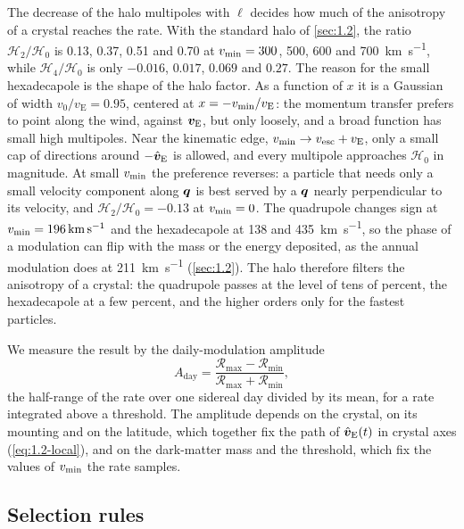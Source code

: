 The decrease of the halo multipoles with $\ell$ decides how much of the anisotropy of a crystal reaches the rate. With the standard halo of \cref{sec:1.2}, the ratio $\mathcal{H}_2/\mathcal{H}_0$ is 0.13, 0.37, 0.51 and 0.70 at $v_{\mathrm{min}} = 300$, 500, 600 and \SI{700}{km.s^{-1}}, while $\mathcal{H}_4/\mathcal{H}_0$ is only $-0.016$, $0.017$, $0.069$ and $0.27$. The reason for the small hexadecapole is the shape of the halo factor. As a function of $x$ it is a Gaussian of width $v_0/v_{\mathrm{E}} = 0.95$, centered at $x = -v_{\mathrm{min}}/v_{\mathrm{E}}$: the momentum transfer prefers to point along the wind, against $\bm{v}_{\mathrm{E}}$, but only loosely, and a broad function has small high multipoles. Near the kinematic edge, $v_{\mathrm{min}} \to v_{\mathrm{esc}} + v_{\mathrm{E}}$, only a small cap of directions around $-\hat{\bm{v}}_{\mathrm{E}}$ is allowed, and every multipole approaches $\mathcal{H}_0$ in magnitude. At small $v_{\mathrm{min}}$ the preference reverses: a particle that needs only a small velocity component along $\bm{q}$ is best served by a $\bm{q}$ nearly perpendicular to its velocity, and $\mathcal{H}_2/\mathcal{H}_0 = -0.13$ at $v_{\mathrm{min}} = 0$. The quadrupole changes sign at $v_{\mathrm{min}} = \SI{196}{km.s^{-1}}$ and the hexadecapole at 138 and \SI{435}{km.s^{-1}}, so the phase of a modulation can flip with the mass or the energy deposited, as the annual modulation does at \SI{211}{km.s^{-1}} (\cref{sec:1.2}). The halo therefore filters the anisotropy of a crystal: the quadrupole passes at the level of tens of percent, the hexadecapole at a few percent, and the higher orders only for the fastest particles.

We measure the result by the daily-modulation amplitude
\begin{equation}
  A_{\mathrm{day}} = \frac{\mathcal{R}_{\mathrm{max}} - \mathcal{R}_{\mathrm{min}}}{\mathcal{R}_{\mathrm{max}} + \mathcal{R}_{\mathrm{min}}} ,
  \label{eq:11.7-Aday}
\end{equation}
the half-range of the rate over one sidereal day divided by its mean, for a rate integrated above a threshold. The amplitude depends on the crystal, on its mounting and on the latitude, which together fix the path of $\hat{\bm{v}}_{\mathrm{E}}(t)$ in crystal axes (\cref{eq:1.2-local}), and on the dark-matter mass and the threshold, which fix the values of $v_{\mathrm{min}}$ the rate samples.

\subsection{Selection rules}

